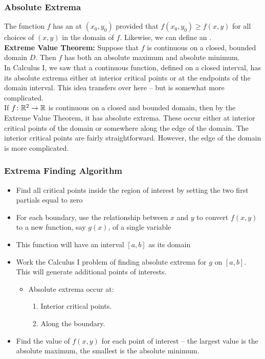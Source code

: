 \subsubsection{Absolute Extrema}

The function \(f\) has an  at \((x_{0}, y_{0})\) provided that \(f(x_{0}, y_{0}) \geq f(x, y)\) for all choices of \((x, y)\) in the domain of \(f\). Likewise, we can define an . \\

\textbf{Extreme Value Theorem:} Suppose that \(f\) is continuous on a closed, bounded domain \(D\). Then \(f\) has both an absolute maximum and absolute minimum. \\

In Calculus I, we saw that a continuous function, defined on a closed interval, has its absolute extrema either at interior critical points or at the endpoints of the domain interval. This idea transfers over here – but is somewhat more complicated. \\

If \(f \colon \mathbb{R}^{2} \to \mathbb{R}\) is continuous on a closed and bounded domain, then by the Extreme Value Theorem, it has absolute extrema. These occur either at interior critical points of the domain or somewhere along the edge of the domain. The interior critical points are fairly straightforward. However, the edge of the domain is more complicated.

\subsubsection{Extrema Finding Algorithm}

\begin{itemize}
    \item Find all critical points inside the region of interest by setting the two first partials equal to zero
    \item For each boundary, use the relationship between \(x\) and \(y\) to convert \(f(x, y)\) to a new function, say \(g(x)\), of a single variable
    \item This function will have an interval \([a, b]\) as its domain
    \item Work the Calculus I problem of finding absolute extrema for \(g\) on \([a, b]\). This will generate additional points of interests.
    \begin{itemize}
        \item Absolute extrema occur at:
        \begin{enumerate}[label=\arabic*.]
            \item Interior critical points.
            \item Along the boundary.
        \end{enumerate}
    \end{itemize}
    \item Find the value of \(f(x, y)\) for each point of interest – the largest value is the absolute maximum, the smallest is the absolute minimum.
\end{itemize}

